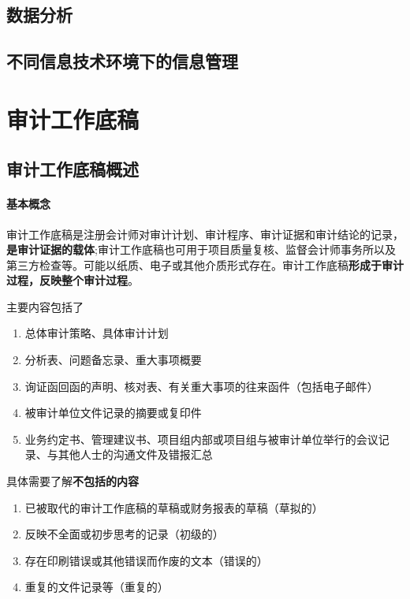 \documentclass[UTF8,12pt]{ctexart}
\numberwithin{equation}{section} %
\numberwithin{figure}{section}
\numberwithin{table}{section}
\begin{document}
	\subsection{数据分析}
	
	\subsection{不同信息技术环境下的信息管理}
	
	\newpage
	\section{审计工作底稿}
	
	\subsection{审计工作底稿概述}
	\paragraph{基本概念}审计工作底稿是注册会计师对审计计划、审计程序、审计证据和审计结论的记录，\textbf{是审计证据的载体};审计工作底稿也可用于项目质量复核、监督会计师事务所以及第三方检查等。可能以纸质、电子或其他介质形式存在。审计工作底稿\textbf{形成于审计过程，反映整个审计过程}。
	
	主要内容包括了
	\begin{enumerate}
		\item 总体审计策略、具体审计计划
		
		\item 分析表、问题备忘录、重大事项概要
		
		\item 询证函回函的声明、核对表、有关重大事项的往来函件（包括电子邮件）
		
		\item 被审计单位文件记录的摘要或复印件
		
		\item 业务约定书、管理建议书、项目组内部或项目组与被审计单位举行的会议记录、与其他人士的沟通文件及错报汇总
	\end{enumerate}
	
	具体需要了解\textbf{不包括的内容}
	\begin{enumerate}
		\item 已被取代的审计工作底稿的草稿或财务报表的草稿（草拟的）
		
		\item 反映不全面或初步思考的记录（初级的）
		
		\item 存在印刷错误或其他错误而作废的文本（错误的）
		
		\item 重复的文件记录等（重复的）
	\end{enumerate}
	
\end{document}
